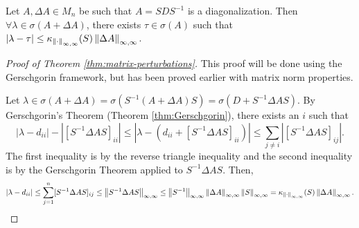 \begin{theorem}
\label{thm:matrix-perturbations}
Let $A, \Delta A \in M_n$ be such that $A = SDS^{-1}$ is a diagonalization. Then $\forall \lambda \in \sigma(A+\Delta A)$, there exists $\tau \in \sigma(A)$ such that $|\lambda-\tau|\le \kappa_{\left\lVert\cdot\right\rVert_{\infty,\infty}}(S)\left\lVert\Delta A\right\rVert_{\infty,\infty}$.
\end{theorem}
\begin{proof}[Proof of Theorem \ref{thm:matrix-perturbations}]
This proof will be done using the Gerschgorin framework, but has been proved earlier with matrix norm properties. 

Let $\lambda \in \sigma(A+\Delta A) = \sigma(S^{-1}(A+\Delta A)S) = \sigma(D + S^{-1}\Delta AS)$. By Gerschgorin's Theorem (Theorem \ref{thm:Gerschgorin}), there exists an $i$ such that
\[
    |\lambda-d_{ii}| - \left|[S^{-1}\Delta AS]_{ii}\right| \le \left|\lambda - (d_{ii}+[S^{-1}\Delta AS]_{ii})\right| \le \sum_{j\not=i}\left|[S^{-1}\Delta AS]_{ij}\right|.
\]
The first inequality is by the reverse triangle inequality and the second inequality is by the Gerschgorin Theorem applied to $S^{-1}\Delta AS$. Then,
\[
    |\lambda-d_{ii}| \le \sum_{j=1}^n[S^{-1}\Delta AS]_{ij} \le \left\lVert S^{-1}\Delta AS\right\rVert_{\infty,\infty} \le \left\lVert S^{-1}\right\rVert_{\infty,\infty} \left\lVert\Delta A\right\rVert_{\infty,\infty} \left\lVert S\right\rVert_{\infty,\infty} = \kappa_{\left\lVert\cdot\right\rVert_{\infty,\infty}}(S)\left\lVert\Delta A\right\rVert_{\infty,\infty}.
\]
\end{proof}
